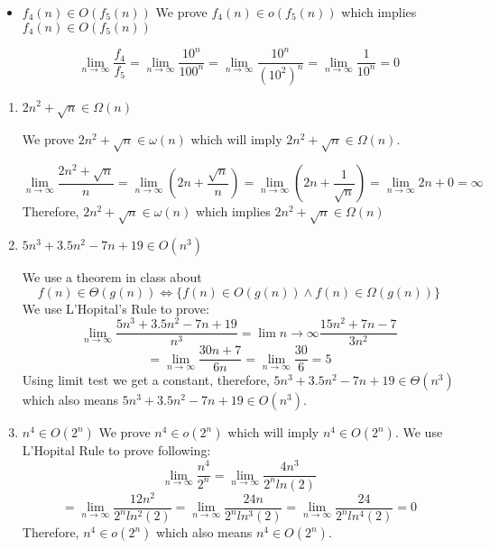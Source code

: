 \documentclass{cpsc413Solutions}
\begin{document}
\begin{problemlist}
\begin{problem}
\begin{answer}
\begin{itemize}
\item $f_4(n) \in {O}(f_5(n))$
We prove $f_4(n) \in o(f_5(n))$ which implies $f_4(n) \in {O}(f_5(n))$

$$\lim_{n\to\infty}\frac{f_4}{f_5} = \lim_{n\to\infty} \frac{10^n}{100^n} = \lim_{n\to \infty} \frac{10^n}{(10^2)^n} = \lim_{n\to\infty} \frac{1}{10^n} = 0$$

\end{itemize}
\end{answer}
\end{problem}


\begin{problem}
\begin{answer}
\begin{enumerate}
    \item $2n^2 + \sqrt{n} \in \Omega(n)$
    
    We prove $2n^2 + \sqrt{n} \in \omega(n)$ which will imply $2n^2 + \sqrt{n} \in \Omega(n)$.
    
    $$\lim_{n\to \infty} \frac{2n^2+\sqrt{n}}{n} = \lim_{n\to\infty} (2n + \frac{\sqrt{n}}{n})= \lim_{n\to\infty}(2n + \frac{1}{\sqrt{n}}) =\lim_{n\to\infty}2n + 0= \infty$$
    Therefore, $2n^2 + \sqrt{n} \in \omega(n)$ which implies $2n^2 + \sqrt{n} \in \Omega(n)$
    
    \item $5n^3 +3.5n^2 -7n +19 \in {O}(n^3)$
    
     We use a theorem in class about \[f(n) \in \Theta(g(n)) \Leftrightarrow  \{f(n) \in O(g(n)) \land f(n) \in \Omega(g(n))\}\]
    We use L'Hopital's Rule to prove:
    $$\lim_{n\to\infty} \frac{5n^3 +3.5n^2 -7n +19}{n^3} = \lim_{}n\to\infty \frac{15n^2 + 7n -7}{3n^2}$$
    $$= \lim_{n\to \infty} \frac{30n+7}{6n} = \lim_{n\to\infty} \frac{30}{6}=5$$
    Using limit test we get a constant, therefore, $5n^3 +3.5n^2 -7n +19 \in \Theta(n^3)$ which also means $5n^3 +3.5n^2 -7n +19 \in {O}(n^3)$.
    
    \item $n^4 \in {O}(2^n)$
    We prove $n^4 \in {o}(2^n)$ which will imply $n^4 \in {O}(2^n)$. We use L'Hopital Rule to prove following:
    $$\lim_{n\to\infty} \frac{n^4}{2^n} = \lim_{n\to\infty} \frac{4n^3}{2^n ln(2)}$$
    $$= \lim_{n\to\infty} \frac{12n^2}{2^n ln^2(2)} = \lim_{n\to\infty} \frac{24n}{2^n ln^3(2)} = \lim_{n\to\infty} \frac{24}{2^n ln^4(2)} = 0$$
    Therefore, $n^4 \in {o}(2^n)$ which also means $n^4 \in {O}(2^n)$.
    

\end{enumerate}
\end{answer}
\end{problem}
\end{problemlist}
\end{document}
